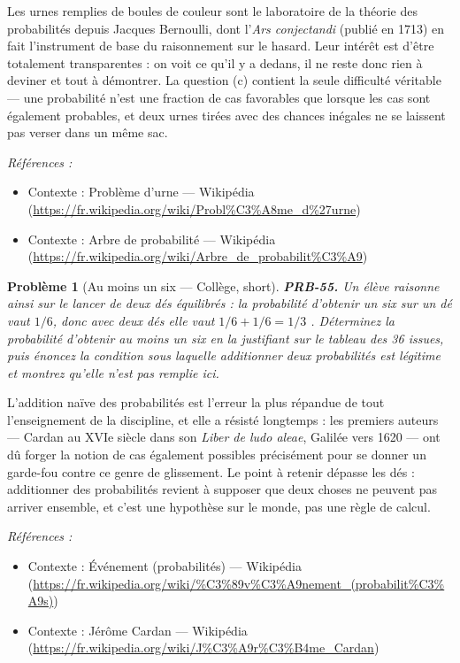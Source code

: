 \documentclass[11pt]{article}
\newtheorem{problem}{Problème}
\newenvironment{refs}{\par\small\noindent\emph{Références :}\begin{itemize}\setlength\itemsep{0pt}}{\end{itemize}\normalsize}
\begin{document}
\noindent Les urnes remplies de boules de couleur sont le laboratoire de la théorie des
probabilités depuis Jacques Bernoulli, dont l'\textit{Ars conjectandi} (publié en 1713) en fait
l'instrument de base du raisonnement sur le hasard. Leur intérêt est d'être totalement
transparentes : on voit ce qu'il y a dedans, il ne reste donc rien à deviner et tout à démontrer.
La question (c) contient la seule difficulté véritable --- une probabilité n'est une fraction de cas
favorables que lorsque les cas sont également probables, et deux urnes tirées avec des chances
inégales ne se laissent pas verser dans un même sac.

\begin{refs}
\item Contexte : Problème d'urne --- Wikipédia (\url{https://fr.wikipedia.org/wiki/Probl%C3%A8me_d%27urne})
\item Contexte : Arbre de probabilité --- Wikipédia (\url{https://fr.wikipedia.org/wiki/Arbre_de_probabilit%C3%A9})
\end{refs}

\bigskip

\begin{problem}[{Au moins un six --- Collège, short}]
\textbf{PRB-55.} Un élève raisonne ainsi sur le lancer de deux dés
équilibrés : \og{} la probabilité d'obtenir un six sur un dé vaut $ 1/6 $, donc avec deux dés elle
vaut $ 1/6 + 1/6 = 1/3 $ \fg{}. Déterminez la probabilité d'obtenir au moins un six en la justifiant
sur le tableau des 36 issues, puis énoncez la condition sous laquelle additionner deux probabilités
est légitime et montrez qu'elle n'est pas remplie ici.
\end{problem}

\noindent L'addition naïve des probabilités est l'erreur la plus répandue de tout
l'enseignement de la discipline, et elle a résisté longtemps : les premiers auteurs --- Cardan au
XVIe siècle dans son \textit{Liber de ludo aleae}, Galilée vers 1620 --- ont dû forger la
notion de \og{} cas également possibles \fg{} précisément pour se donner un garde-fou contre ce genre de
glissement. Le point à retenir dépasse les dés : additionner des probabilités revient à supposer
que deux choses ne peuvent pas arriver ensemble, et c'est une hypothèse sur le monde, pas une règle
de calcul.

\begin{refs}
\item Contexte : Événement (probabilités) --- Wikipédia (\url{https://fr.wikipedia.org/wiki/%C3%89v%C3%A9nement_(probabilit%C3%A9s)})
\item Contexte : Jérôme Cardan --- Wikipédia (\url{https://fr.wikipedia.org/wiki/J%C3%A9r%C3%B4me_Cardan})
\end{refs}
\end{document}
